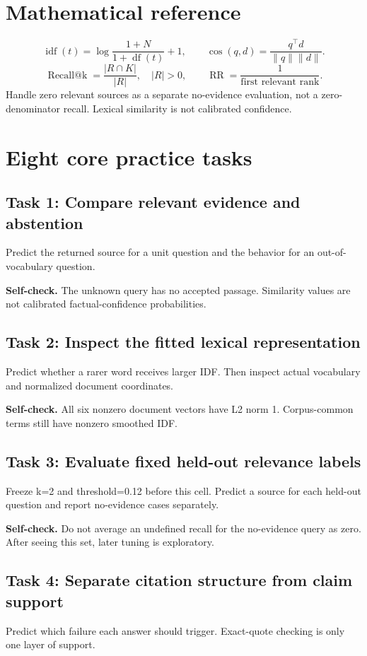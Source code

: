 \section{Mathematical reference}\[\operatorname{idf}(t)=\log\frac{1+N}{1+\operatorname{df}(t)}+1,\qquad \cos(q,d)=\frac{q^\top d}{\lVert q\rVert\lVert d\rVert}.\]\[\operatorname{Recall@k}=\frac{|R\cap K|}{|R|},\quad |R|>0,\qquad \operatorname{RR}=\frac{1}{\text{first relevant rank}}.\]Handle zero relevant sources as a separate no-evidence evaluation, not a zero-denominator recall. Lexical similarity is not calibrated confidence.
\section{Eight core practice tasks}
\subsection{Task 1: Compare relevant evidence and abstention}
Predict the returned source for a unit question and the behavior for an out-of-vocabulary question.

\textbf{Self-check.} The unknown query has no accepted passage. Similarity values are not calibrated factual-confidence probabilities.
\subsection{Task 2: Inspect the fitted lexical representation}
Predict whether a rarer word receives larger IDF. Then inspect actual vocabulary and normalized document coordinates.

\textbf{Self-check.} All six nonzero document vectors have L2 norm 1. Corpus-common terms still have nonzero smoothed IDF.
\subsection{Task 3: Evaluate fixed held-out relevance labels}
Freeze k=2 and threshold=0.12 before this cell. Predict a source for each held-out question and report no-evidence cases separately.

\textbf{Self-check.} Do not average an undefined recall for the no-evidence query as zero. After seeing this set, later tuning is exploratory.
\subsection{Task 4: Separate citation structure from claim support}
Predict which failure each answer should trigger. Exact-quote checking is only one layer of support.

